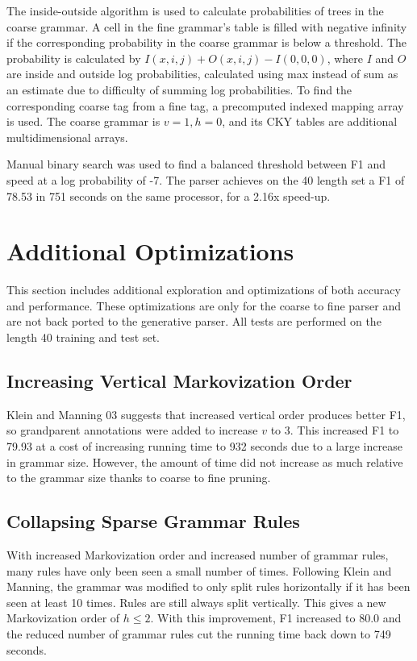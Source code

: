 \documentclass[11pt]{article}
\begin{document}
The inside-outside algorithm is used to calculate probabilities of trees in the coarse grammar.
A cell in the fine grammar's table is filled with negative infinity if the corresponding probability
in the coarse grammar is below a threshold. The probability is calculated by
$I(x,i,j)+O(x,i,j)-I(0,0,0)$, where $I$ and $O$ are inside and outside log probabilities, calculated
using max instead of sum as an estimate due to difficulty of summing log probabilities.
To find the corresponding coarse tag from a fine tag, a precomputed indexed mapping array is used.
The coarse grammar is $v=1, h=0$, and its CKY tables are additional multidimensional arrays.

Manual binary search was used to find a balanced threshold between F1 and speed at a log
probability of -7.
The parser achieves on the 40 length set a F1 of 78.53 in 751 seconds on the same processor,
for a 2.16x speed-up.

\section{Additional Optimizations}
This section includes additional exploration and optimizations of both accuracy and performance.
These optimizations are only for the coarse to fine parser and are not back ported to the
generative parser. All tests are performed on the length 40 training and test set.

\subsection{Increasing Vertical Markovization Order}
Klein and Manning 03 suggests that increased vertical order produces better F1, so grandparent
annotations were added to increase $v$ to 3. This increased F1 to 79.93
at a cost of increasing running time to 932 seconds due to a large increase in grammar size.
However, the amount of time did not increase as much relative to the grammar size thanks to
coarse to fine pruning.

\subsection{Collapsing Sparse Grammar Rules}
With increased Markovization order and increased number of grammar rules, many rules have only been
seen a small number of times. Following Klein and Manning, the grammar was modified to only split
rules horizontally if it has been seen at least 10 times. Rules are still always split vertically.
This gives a new Markovization order of $h\leq 2$. With this improvement, F1 increased to 80.0
and the reduced number of grammar rules cut the running time back down to 749 seconds.
\end{document}
